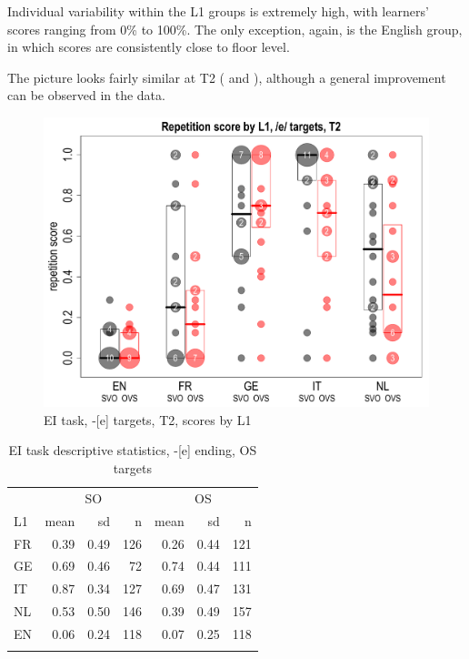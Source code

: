 Individual variability within the L1 groups is extremely high, with learners’ scores ranging from 0\% to 100\%. The only exception, again, is the English group, in which scores are consistently close to floor level.

The picture looks fairly similar at T2 ( and ), although a general improvement can be observed in the data. 

\begin{figure}
    \includegraphics[width=.9\textwidth]{figures/04-2.pdf}%
    \caption{EI task, -[e] targets, T2, scores by L1}
    \label{fig:04:2}
\end{figure}

\begin{table}
    \begin{tabular}{lrrr rrr}
    \lsptoprule
     & \multicolumn{3}{c}{ SO} & \multicolumn{3}{c}{ OS}\\
    L1& mean & sd & n & mean & sd & n\\
    \cmidrule(r){2-4}\cmidrule(l){5-7}
    FR & 0.39 & 0.49 & 126 & 0.26 & 0.44 & 121\\
    GE & 0.69 & 0.46 & 72 & 0.74 & 0.44 & 111\\
    IT & 0.87 & 0.34 & 127 & 0.69 & 0.47 & 131\\
    NL & 0.53 & 0.50 & 146 & 0.39 & 0.49 & 157\\
    EN & 0.06 & 0.24 & 118 & 0.07 & 0.25 & 118\\
    \lspbottomrule
    \end{tabular}
    \caption{EI task descriptive statistics, -[e] ending, OS targets}
    \label{tab:04:2}
    \label{tab:03:2}
\end{table}

